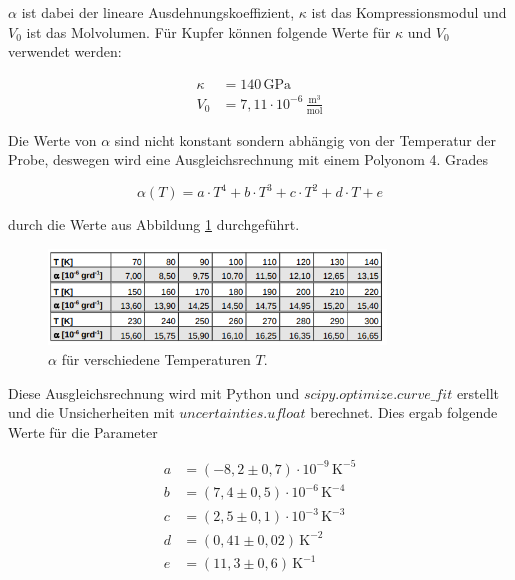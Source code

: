 $\alpha$ ist dabei der lineare Ausdehnungskoeffizient, $\kappa$ \cite{kappa} ist das Kompressionsmodul und $V_0$ \cite{V0} ist das Molvolumen. Für Kupfer können folgende Werte für $\kappa$ und $V_0$ verwendet werden:

\begin{align*}
    \kappa &= 140 \, \mathrm{GPa} \\
    V_0 &= 7, \! 11 \cdot 10^{-6} \, \frac{\mathrm{m}^3}{\mathrm{mol}}
\end{align*}

Die Werte von $\alpha$ sind nicht konstant sondern abhängig von der Temperatur der Probe, deswegen wird eine Ausgleichsrechnung mit einem Polyonom 4. Grades

\begin{equation}
    \alpha (T) = a \cdot T^4 + b \cdot T^3 + c \cdot T^2 + d \cdot T + e
    \label{eq:alpha}
\end{equation}

durch die Werte aus Abbildung \ref{fig:alpha} durchgeführt.

\begin{figure}
    \centering
    \includegraphics[width=0.8\textwidth]{build/alpha.PNG}
    \caption{$\alpha$ für verschiedene Temperaturen $T$. \cite{Anleitung}}
    \label{fig:alpha}
\end{figure}

Diese Ausgleichsrechnung wird mit Python und $scipy.optimize.curve\_fit$ erstellt und die Unsicherheiten mit $uncertainties.ufloat$ berechnet. Dies ergab folgende Werte für die Parameter

\begin{align*}
    a &= (-8, \! 2 \pm 0, \! 7) \cdot 10^{-9} \, \mathrm{K}^{-5} \\
    b &= (7, \! 4 \pm 0, \! 5) \cdot 10^{-6} \, \mathrm{K}^{-4} \\
    c &= (2, \! 5 \pm 0, \! 1) \cdot 10^{-3} \, \mathrm{K}^{-3} \\
    d &= (0, \! 41 \pm 0, \! 02) \, \mathrm{K}^{-2} \\
    e &= (11, \! 3 \pm 0, \! 6) \, \mathrm{K}^{-1}
\end{align*}

